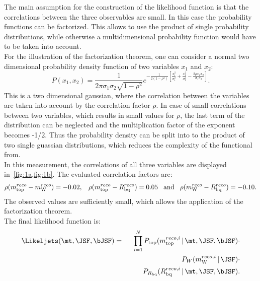 {{{\noindent The main assumption for the construction of the likelihood function is that the correlations between the three observables are small. In this case the probability  functions can be factorized. This allows to use the product of single probability distributions, while otherwise a multidimensional probability function would have to be taken into account.\\



 \noindent For the illustration of the factorization theorem, one can consider a normal two dimensional probability density function of two variables $x_1$ and $x_2$:
 \begin{equation}
 	P(x_1,x_2) = \frac{1}{2\pi \sigma_1 \sigma_2 \sqrt{1-\rho^2}}  e^{-\frac{1}{2(1-\rho^2)} [\frac{x_1^2}{\sigma_1^2} + \frac{x_2^2}{\sigma_2^2} - \frac{2\rho x_1 x_2}{\sigma_1 \sigma_2}]}.
 \end{equation}
 \noindent This is a two dimensional gaussian, where the correlation between the variables are taken into account by the correlation factor $\rho$. In case of small correlations between two variables, which results in small values for $\rho$, the last term of the distribution can be neglected and the multiplication factor of the exponent becomes -1/2. Thus the probability density can be split into to the product of two single guassian distributions, which reduces the complexity of the functional from.\\
 
 

\noindent In this measurement, the correlations of all three variables are displayed in~\cref{fig:1a,fig:1b}. The evaluated correlation factors are:
\begin{eqnarray*}
\rho (m_{\text{top}}^{reco} - m_\text{W}^{reco}) = -0.02,\hspace{0.3cm}\rho (m_{\text{top}}^{reco} - R_{\text{bq}}^{reco}) =0.05 \hspace{0.3cm} \text{and} \hspace{0.3cm}
\rho (m_{\text{W}}^{reco} - R_{\text{bq}}^{reco}) = -0.10.\nonumber \\ 
\end{eqnarray*}
\noindent The observed values are sufficiently small, which allows the application of the factorization theorem. \\
 The final likelihood function is:
\begin{eqnarray}
\Likeljets(\mt, \JSF, \bJSF)  &=& 
\prod_{i=1}^{N} P_{\text{top}}(m_{\text{top}}^{reco,i}\,\vert\,\mt, \JSF, \bJSF)\cdot \nonumber \\ &&\quad\quad P_W(m_{\text{W}}^{reco,i}\,\vert\,\JSF)\cdot \nonumber \\ 
 \vspace{0.1cm}
&&\quad\quad P_{R_{\text{bq}}}(R_{\text{bq}}^{reco,i}\,\vert\,\mt,\JSF,\bJSF).
\label{eq:LikeLJ1} 
\end{eqnarray}

}}}

